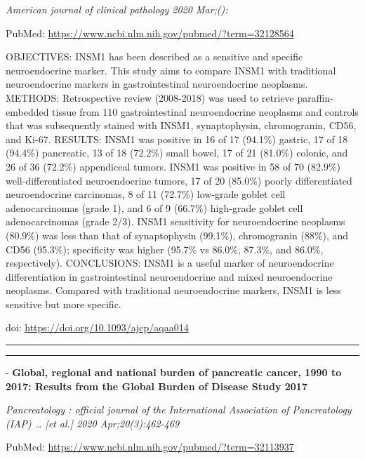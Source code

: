 \documentclass[
]{article}
\begin{document}
\emph{American journal of clinical pathology 2020 Mar;():}

PubMed: \url{https://www.ncbi.nlm.nih.gov/pubmed/?term=32128564}

OBJECTIVES: INSM1 has been described as a sensitive and specific
neuroendocrine marker. This study aims to compare INSM1 with traditional
neuroendocrine markers in gastrointestinal neuroendocrine neoplasms.
METHODS: Retrospective review (2008-2018) was used to retrieve
paraffin-embedded tissue from 110 gastrointestinal neuroendocrine
neoplasms and controls that was subsequently stained with INSM1,
synaptophysin, chromogranin, CD56, and Ki-67. RESULTS: INSM1 was
positive in 16 of 17 (94.1\%) gastric, 17 of 18 (94.4\%) pancreatic, 13
of 18 (72.2\%) small bowel, 17 of 21 (81.0\%) colonic, and 26 of 36
(72.2\%) appendiceal tumors. INSM1 was positive in 58 of 70 (82.9\%)
well-differentiated neuroendocrine tumors, 17 of 20 (85.0\%) poorly
differentiated neuroendocrine carcinomas, 8 of 11 (72.7\%) low-grade
goblet cell adenocarcinomas (grade 1), and 6 of 9 (66.7\%) high-grade
goblet cell adenocarcinomas (grade 2/3). INSM1 sensitivity for
neuroendocrine neoplasms (80.9\%) was less than that of synaptophysin
(99.1\%), chromogranin (88\%), and CD56 (95.3\%); specificity was higher
(95.7\% vs 86.0\%, 87.3\%, and 86.0\%, respectively). CONCLUSIONS: INSM1
is a useful marker of neuroendocrine differentiation in gastrointestinal
neuroendocrine and mixed neuroendocrine neoplasms. Compared with
traditional neuroendocrine markers, INSM1 is less sensitive but more
specific.

doi: \url{https://doi.org/10.1093/ajcp/aqaa014}

\begin{center}\rule{0.5\linewidth}{0.5pt}\end{center}

\begin{center}\rule{0.5\linewidth}{0.5pt}\end{center}

- \textbf{Global, regional and national burden of pancreatic cancer,
1990 to 2017: Results from the Global Burden of Disease Study 2017}

\emph{Pancreatology : official journal of the International Association
of Pancreatology (IAP) \ldots{} {[}et al.{]} 2020 Apr;20(3):462-469}

PubMed: \url{https://www.ncbi.nlm.nih.gov/pubmed/?term=32113937}
\end{document}
